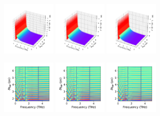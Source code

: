 \documentclass[a4paper]{article}
\begin{document}
\begin{figure}[H]
  \centering
  \includegraphics[width=0.23\textwidth]{cond3d_imag-A2-v0-imp0.pdf}
  \includegraphics[width=0.23\textwidth]{cond3d_imag-A2-v1-imp0.pdf}
  \includegraphics[width=0.23\textwidth]{cond3d_imag-A2-v2-imp0.pdf}
\end{figure}
\begin{figure}[H]
  \centering
  \includegraphics[width=0.23\textwidth]{cond_pcolor-A2-v0-imp0.pdf}
  \includegraphics[width=0.23\textwidth]{cond_pcolor-A2-v1-imp0.pdf}
  \includegraphics[width=0.23\textwidth]{cond_pcolor-A2-v2-imp0.pdf}
\end{figure}
\end{document}

